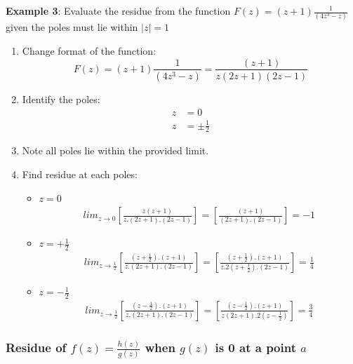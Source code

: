 \documentclass[10pt,a4paper]{article}
\begin{document}
\textbf{Example 3}: Evaluate the residue from the function $F(z)=(z+1)\frac{1}{(4z^3-z)}$ given the
poles must lie within $|z|=1$
\begin{enumerate}
    \item Change format of the function:
    $$
        F(z) = (z+1)\frac{1}{(4z^3-z)} = \frac{(z+1)}{z(2z+1)(2z-1)}
    $$

    \item Identify the poles:
    \begin{align*}
        z &= 0 \\
        z &= \pm \frac{1}{2}
    \end{align*}

    \item Note all poles lie within the provided limit.
    
    \item Find residue at each poles:
    \begin{itemize}
        \item $z = 0$
        \begin{align*}
            lim_{z \rightarrow 0}\left[\frac{z(z+1)}{z.(2z+1).(2z-1)}\right] = \left[\frac{(z+1)}{(2z+1).(2z-1)}\right] = -1
        \end{align*}
        \item $z = +\frac{1}{2}$
        \begin{align*}
            lim_{z \rightarrow \frac{1}{2}}\left[\frac{(z+\frac{1}{2}).(z+1)}{z.(2z+1).(2z-1)}\right] = \left[\frac{(z+\frac{1}{2}).(z+1)}{z.2(z+\frac{1}{2}).(2z-1)}\right] = \frac{1}{4}
        \end{align*}
        \item $z = -\frac{1}{2}$
        \begin{align*}
            lim_{z \rightarrow \frac{1}{2}}\left[\frac{(z-\frac{1}{2}).(z+1)}{z.(2z+1).(2z-1)}\right] = \left[\frac{(z-\frac{1}{2}).(z+1)}{z(2z+1).2(z-\frac{1}{2})}\right] = \frac{3}{4}
        \end{align*}
    \end{itemize}
\end{enumerate}

\subsubsection{Residue of $f(z)=\frac{h(z)}{g(z)}$ when $g(z)$ is 0 at a point $a$}
\end{document}
